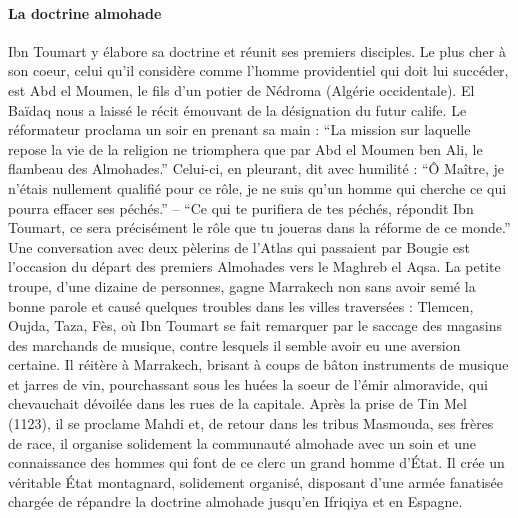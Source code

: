 \paragraph{
La doctrine almohade}
 Ibn Toumart y élabore sa doctrine et réunit ses premiers disciples. Le plus cher à son coeur,
celui qu’il considère comme l’homme providentiel qui doit lui succéder, est Abd el Moumen,
le fils d’un potier de Nédroma (Algérie occidentale). El Baïdaq nous a laissé le récit émouvant
de la désignation du futur calife. Le réformateur proclama un soir en prenant sa main : “La
mission sur laquelle repose la vie de la religion ne triomphera que par Abd el Moumen ben Ali,
le flambeau des Almohades.” Celui-ci, en pleurant, dit avec humilité : “Ô Maître, je n’étais
nullement qualifié pour ce rôle, je ne suis qu’un homme qui cherche ce qui pourra effacer ses
péchés.” – “Ce qui te purifiera de tes péchés, répondit Ibn Toumart, ce sera précisément le rôle
que tu joueras dans la réforme de ce monde.”
 Une conversation avec deux pèlerins de l’Atlas qui passaient par Bougie est l’occasion du
départ des premiers Almohades vers le Maghreb el Aqsa. La petite troupe, d’une dizaine de
personnes, gagne Marrakech non sans avoir semé la bonne parole et causé quelques troubles
dans les villes traversées : Tlemcen, Oujda, Taza, Fès, où Ibn Toumart se fait remarquer par
le saccage des magasins des marchands de musique, contre lesquels il semble avoir eu une
aversion certaine. Il réitère à Marrakech, brisant à coups de bâton instruments de musique
et jarres de vin, pourchassant sous les huées la soeur de l’émir almoravide, qui chevauchait
dévoilée dans les rues de la capitale.
 Après la prise de Tin Mel (1123), il se proclame Mahdi et, de retour dans les tribus Masmouda,
ses frères de race, il organise solidement la communauté almohade avec un soin et une
connaissance des hommes qui font de ce clerc un grand homme d’État. Il crée un véritable
État montagnard, solidement organisé, disposant d’une armée fanatisée chargée de répandre
la doctrine almohade jusqu’en Ifriqiya et en Espagne.

